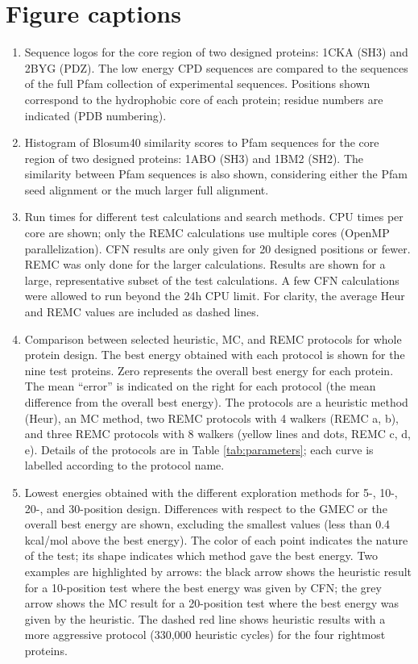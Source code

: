 \documentclass[a4paper,12pt]{article}
\begin{document}
\section*{Figure captions}
\begin{enumerate}
\item \label{fig:logos}
Sequence logos for the core region of two designed proteins: 1CKA (SH3) and 2BYG (PDZ).
The low energy CPD sequences are compared to the sequences of the full Pfam collection of
experimental sequences. Positions shown correspond to the hydrophobic core of each
protein; residue numbers are indicated (PDB numbering).

\item \label{fig:similarity}
Histogram of Blosum40 similarity scores to Pfam sequences for the core region of two
designed proteins: 1ABO (SH3) and 1BM2 (SH2). The similarity between Pfam sequences is
also shown, considering either the Pfam seed alignment or the much larger full alignment.

\item \label{fig:cpu}
Run times for different test calculations and search methods. CPU times per core are
shown; only the REMC calculations use multiple cores (OpenMP parallelization). CFN results
are only given for 20 designed positions or fewer. REMC was only done for the larger
calculations. Results are shown for a large, representative subset of the test calculations.
A few CFN calculations were allowed to run beyond the 24h CPU limit. For clarity, the
average Heur and REMC values are included as dashed lines.

\item \label{fig:protocols}
Comparison between selected heuristic, MC, and REMC protocols for whole protein design.
The best energy obtained with each protocol is shown for the nine test proteins. Zero represents
the overall best energy for each protein. The mean ``error'' is indicated on the right for each protocol
(the mean difference from the overall best energy). The protocols are a heuristic method (Heur), an MC
method, two REMC protocols with 4 walkers (REMC a, b), and three REMC protocols with 8 walkers (yellow
lines and dots, REMC c, d, e). Details of the protocols are in Table \ref{tab:parameters}; each curve
is labelled according to the protocol name.

\item \label{fig:errors}
Lowest energies obtained with the different exploration methods for 5-, 10-, 20-, and 30-position design. Differences
with respect to the GMEC or the overall best energy are shown, excluding the smallest values (less than 0.4 kcal/mol
above the best energy). The color of each point indicates the nature of the test; its shape indicates which method
gave the best energy. Two examples are highlighted by arrows: the black arrow shows the heuristic result for a
10-position test where the best energy was given by CFN; the grey arrow shows the MC result for a 20-position test
where the best energy was given by the heuristic. The dashed red line shows heuristic results with a more aggressive
protocol (330,000 heuristic cycles) for the four rightmost proteins.


\end{enumerate}
\end{document}
